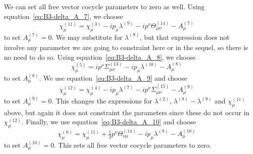 \documentclass[11pt,reqno,a4paper,final]{amsart}
\theoremstyle{plain}
\theoremstyle{definition}
\newcommand{\1}{\mathbb{1}}
\numberwithin{equation}{section}
\begin{document}
\begin{appendices}
We can set all free vector cocycle parameters to zero as well.  Using
equation~\eqref{eq:B3-delta_A_7}, we choose
\begin{equation}
  \chi_\mu^{(11)} = \chi_\mu^{(3)} - i p_\mu \lambda^{(9)} - i p^\nu  \Theta_{\mu\nu}^{(14)} - A_\mu^{(7)}
\end{equation}
to set $A_\mu^{(7)} = 0$.  We may substitute for $\lambda^{(9)}$, but
that expression does not involve any parameter we are going to
constraint here or in the sequel, so there is no need to do so.
Using equation~\eqref{eq:B3-delta_A_8}, we choose
\begin{equation}
  \chi_\mu^{(5)} = i p^\nu \Sigma_{\mu\nu}^{(13)} - i p_\mu  \lambda^{(10)} - A_\mu^{(8)}
\end{equation}
to set $A_\mu^{(8)}$.  We use equation~\eqref{eq:B3-delta_A_9} and choose
\begin{equation}
  \chi_\mu^{(12)} = \chi_\mu^{(4)} - i p_\mu \lambda^{(7)} - i p^\nu  \Sigma_{\mu\nu}^{(15)} - A_\mu^{(9)}
\end{equation}
to set $A_\mu^{(9)} = 0$.  This changes the expressions for
$\lambda^{(2)}$, $\lambda^{(8)}-\lambda^{(9)}$ and $\chi_\mu^{(11)}$
above, but again it does not constraint the parameters since these do
not occur in $\chi_\mu^{(12)}$.  Finally, we use
equation~\eqref{eq:B3-delta_A_10} and choose
\begin{equation}
  \chi_\mu^{(6)} = \chi_\mu^{(11)} + \tfrac i2 p^\nu  \Theta_{\nu\mu}^{(14)} - i p_\mu \lambda^{(8)} - A_\mu^{(10)}
\end{equation}
to set $A_\mu^{(10)} = 0$.  This sets all free vector cocycle
parameters to zero.


\end{appendices}
\end{document}
